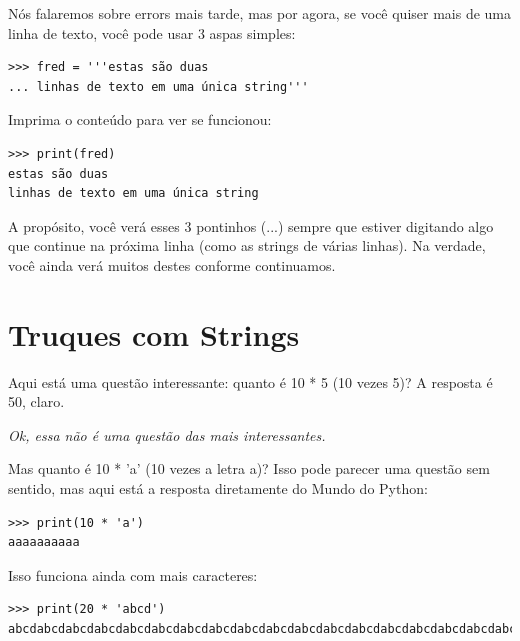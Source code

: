 Nós falaremos sobre errors mais tarde, mas por agora, se você quiser mais de uma linha de texto, você pode usar 3 aspas simples:

\begin{listing}
\begin{verbatim}
>>> fred = '''estas são duas
... linhas de texto em uma única string'''
\end{verbatim}
\end{listing}

\noindent
Imprima o conteúdo para ver se funcionou:

\begin{listing}
\begin{verbatim}
>>> print(fred)
estas são duas
linhas de texto em uma única string
\end{verbatim}
\end{listing}

A propósito, você verá esses 3 pontinhos (...) sempre que estiver digitando algo que continue na próxima linha (como as strings de várias linhas). Na verdade, você ainda verá muitos destes conforme continuamos.

\section{Truques com Strings}\label{trickswithstrings}

Aqui está uma questão interessante: quanto é 10 * 5 (10 vezes 5)? A resposta é 50, claro.

\noindent
\emph{Ok, essa não é uma questão das mais interessantes.}

Mas quanto é 10 * 'a' (10 vezes a letra a)? Isso pode parecer uma questão sem sentido, mas aqui está a resposta diretamente do Mundo do Python:

\begin{listing}
\begin{verbatim}
>>> print(10 * 'a')
aaaaaaaaaa
\end{verbatim}
\end{listing}

Isso funciona ainda com mais caracteres:

\begin{listing}
\begin{verbatim}
>>> print(20 * 'abcd')
abcdabcdabcdabcdabcdabcdabcdabcdabcdabcdabcdabcdabcdabcdabcdabcdabcdabcdabcdabcd
\end{verbatim}
\end{listing}

